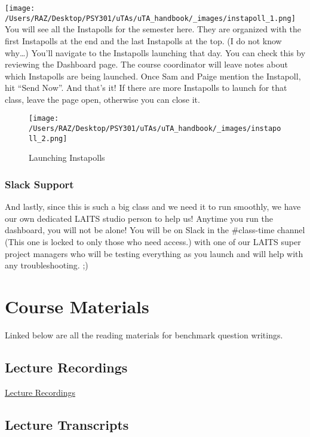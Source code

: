 \documentclass[
]{article}
\begin{document}
\texttt{[image: /Users/RAZ/Desktop/PSY301/uTAs/uTA\_handbook/\_images/instapoll\_1.png]} You will see all the Instapolls for the semester here. They are organized with the first Instapolls at the end and the last Instapolls at the top. (I do not know why\ldots) You'll navigate to the Instapolls launching that day. You can check this by reviewing the Dashboard page. The course coordinator will leave notes about which Instapolls are being launched. Once Sam and Paige mention the Instapoll, hit ``Send Now''. And that's it! If there are more Instapolls to launch for that class, leave the page open, otherwise you can close it.

\begin{figure}
\centering
\texttt{[image: /Users/RAZ/Desktop/PSY301/uTAs/uTA\_handbook/\_images/instapoll\_2.png]}
\caption{Launching Instapolls}
\end{figure}

\hypertarget{slack-support}{%
\subsubsection{Slack Support}\label{slack-support}}

And lastly, since this is such a big class and we need it to run smoothly, we have our own dedicated LAITS studio person to help us! Anytime you run the dashboard, you will not be alone! You will be on Slack in the \#class-time channel (This one is locked to only those who need access.) with one of our LAITS super project managers who will be testing everything as you launch and will help with any troubleshooting. ;)

\hypertarget{course-materials}{%
\section{Course Materials}\label{course-materials}}

Linked below are all the reading materials for benchmark question writings.

\hypertarget{lecture-recordings}{%
\subsection{Lecture Recordings}\label{lecture-recordings}}

\href{https://utexas.instructure.com/courses/1425333/modules}{Lecture Recordings}

\hypertarget{lecture-transcripts}{%
\subsection{Lecture Transcripts}\label{lecture-transcripts}}
\end{document}
